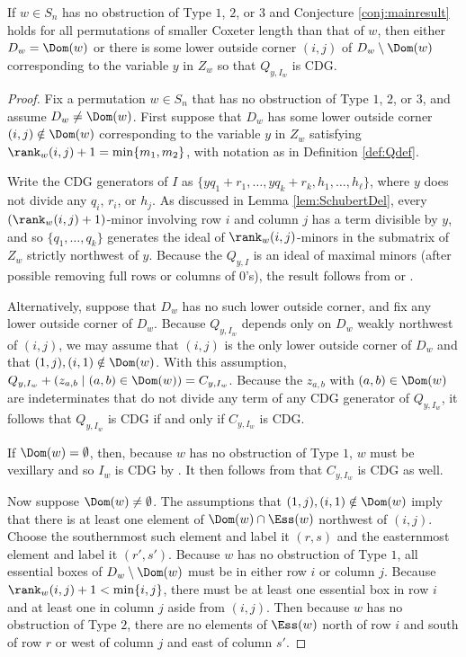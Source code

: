 \begin{lemma}\label{lem:GrobnerQs}
If $w \in S_n$ has no obstruction of Type $1$, $2$, or $3$ and Conjecture \ref{conj:mainresult} holds for all permutations of smaller Coxeter length than that of $w$, then either $D_w = \Dom(w)$ or there is some lower outside corner $(i,j)$ of $D_w \setminus \Dom(w)$ corresponding to the variable $y$ in $Z_w$ so that $Q_{y,I_w}$ is CDG.
\end{lemma}
\begin{proof}
Fix a permutation $w \in S_n$ that has no obstruction of Type $1$, $2$, or $3$, and assume $D_w \neq \Dom(w)$.  First suppose that $D_w$ has some lower outside corner $(i,j)\notin \Dom(w)$ corresponding to the variable $y$ in $Z_w$ satisfying $\rank_w(i,j)+1 = \min\{m_1,m_2\}$, with notation as in Definition \ref{def:Qdef}.  

Write the CDG generators of $I$ as $\{yq_1+r_1, \ldots, yq_k+r_k, h_1, \ldots, h_\ell \}$, where $y$ does not divide any $q_i$, $r_i$, or $h_j$.  As discussed in Lemma \ref{lem:SchubertDel}, every $(\rank_w(i,j)+1)$-minor involving row $i$ and column $j$ has a term divisible by $y$, and so $\{q_1, \ldots, q_k\}$ generates the ideal of $\rank_w(i,j)$-minors in the submatrix of $Z_w$ strictly northwest of $y$.  Because the $Q_{y,I}$ is an ideal of maximal minors (after possible removing full rows or columns of $0$'s), the result follows from \cite[Theorem 4.2]{CDG15} or \cite[Proposition 5.4]{Boo11}.  

Alternatively, suppose that $D_w$ has no such lower outside corner, and fix any lower outside corner of $D_w$.  Because $Q_{y,I_w}$ depends only on $D_w$ weakly northwest of $(i,j)$, we may assume that $(i,j)$ is the only lower outside corner of $D_w$ and that $(1,j), (i,1) \notin \Dom(w)$.  With this assumption, $Q_{y,I_w} +(z_{a,b} \mid (a,b) \in \Dom(w))= C_{y,I_w}$.  Because the $z_{a,b}$ with $(a,b) \in \Dom(w)$ are indeterminates that do not divide any term of any CDG generator of $Q_{y,I_w}$, it follows that $Q_{y,I_w}$ is CDG if and only if $C_{y,I_w}$ is CDG.  

If $\Dom(w) = \emptyset$, then, because $w$ has no obstruction of Type $1$, $w$ must be vexillary and so $I_w$ is CDG by \cite[Theorem 3.8]{KMY09}.   It then follows from  \cite[Theorem 2.1(a)]{KMY09} that $C_{y,I_w}$ is CDG as well.  

Now suppose $\Dom(w) \neq \emptyset$.  The assumptions that $(1,j), (i,1) \notin \Dom(w)$ imply that there is at least one element of $\Dom(w) \cap \Ess(w)$ northwest of $(i,j)$.  Choose the southernmost such element and label it $(r,s)$ and the easternmost element and label it $(r',s')$.  Because $w$ has no obstruction of Type $1$, all essential boxes of $D_w \setminus \Dom(w)$ must be in either row $i$ or column $j$.  Because $\rank_w(i,j)+1 < \min\{i,j\}$, there must be at least one essential box in row $i$ and at least one in column $j$ aside from $(i,j)$. Then because $w$ has no obstruction of Type $2$, there are no elements of $\Ess(w)$ north of row $i$ and south of row $r$ or west of column $j$ and east of column $s'$.  


\end{proof}
